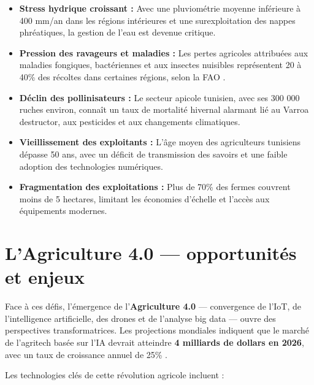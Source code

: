 \begin{itemize}
  \item \textbf{Stress hydrique croissant :} Avec une pluviométrie moyenne inférieure à
        400 mm/an dans les régions intérieures et une surexploitation des nappes
        phréatiques, la gestion de l'eau est devenue critique.

  \item \textbf{Pression des ravageurs et maladies :} Les pertes agricoles attribuées aux
        maladies fongiques, bactériennes et aux insectes nuisibles représentent 20 à 40\%
        des récoltes dans certaines régions, selon la FAO \cite{fao_tunisie_2022}.

  \item \textbf{Déclin des pollinisateurs :} Le secteur apicole tunisien, avec ses
        300 000 ruches environ, connaît un taux de mortalité hivernal alarmant lié au
        Varroa destructor, aux pesticides et aux changements climatiques.

  \item \textbf{Vieillissement des exploitants :} L'âge moyen des agriculteurs tunisiens
        dépasse 50 ans, avec un déficit de transmission des savoirs et une faible adoption
        des technologies numériques.

  \item \textbf{Fragmentation des exploitations :} Plus de 70\% des fermes couvrent moins
        de 5 hectares, limitant les économies d'échelle et l'accès aux équipements modernes.
\end{itemize}

\section{L'Agriculture 4.0 — opportunités et enjeux}

Face à ces défis, l'émergence de l'\textbf{Agriculture 4.0} — convergence de l'IoT, de
l'intelligence artificielle, des drones et de l'analyse big data — ouvre des perspectives
transformatrices. Les projections mondiales indiquent que le marché de l'agritech basée
sur l'IA devrait atteindre \textbf{4 milliards de dollars en 2026}, avec un taux de
croissance annuel de 25\% \cite{kamilaris2018deep}.

Les technologies clés de cette révolution agricole incluent :

